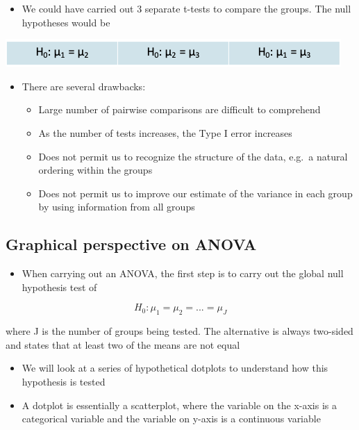 \documentclass[
]{book}
\providecommand{\tightlist}{%
  \setlength{\itemsep}{0pt}\setlength{\parskip}{0pt}}
\begin{document}
\begin{itemize}
\tightlist
\item
  We could have carried out 3 separate t-tests to compare the groups. The null hypotheses would be
\end{itemize}

\includegraphics[width=1\linewidth]{./10_8}

\begin{itemize}
\tightlist
\item
  There are several drawbacks:

  \begin{itemize}
  \tightlist
  \item
    Large number of pairwise comparisons are difficult to comprehend
  \item
    As the number of tests increases, the Type I error increases
  \item
    Does not permit us to recognize the structure of the data, e.g.~a natural ordering within the groups
  \item
    Does not permit us to improve our estimate of the variance in each group by using information from all groups
  \end{itemize}
\end{itemize}

\hypertarget{graphical-perspective-on-anova}{%
\subsection{Graphical perspective on ANOVA}\label{graphical-perspective-on-anova}}

\begin{itemize}
\tightlist
\item
  When carrying out an ANOVA, the first step is to carry out the global null hypothesis test of
\end{itemize}

\[H_0:\mu_1=\mu_2=...=\mu_J\]

where J is the number of groups being tested. The alternative is always two-sided and states that at least two of the means are not equal

\begin{itemize}
\tightlist
\item
  We will look at a series of hypothetical dotplots to understand how this hypothesis is tested
\item
  A dotplot is essentially a scatterplot, where the variable on the x-axis is a categorical variable and the variable on y-axis is a continuous variable
\end{itemize}
\end{document}
